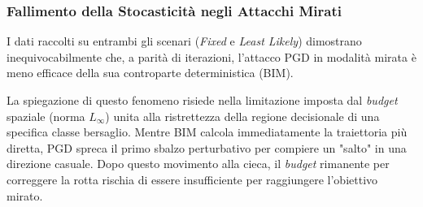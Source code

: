 \documentclass[a4paper, 12pt]{article}
\begin{document}
\subsubsection*{Fallimento della Stocasticità negli Attacchi Mirati}
I dati raccolti su entrambi gli scenari (\textit{Fixed} e \textit{Least Likely}) dimostrano inequivocabilmente che, 
a parità di iterazioni, l'attacco PGD in modalità mirata è meno efficace della sua controparte deterministica (BIM).

La spiegazione di questo fenomeno risiede nella limitazione imposta dal \textit{budget} spaziale
(norma $L_\infty$) unita alla ristrettezza della regione decisionale di una specifica classe bersaglio. 
Mentre BIM calcola immediatamente la traiettoria più diretta, PGD spreca il primo sbalzo perturbativo per compiere
un "salto" in una direzione casuale. Dopo questo movimento alla cieca, il \textit{budget} rimanente per correggere 
la rotta rischia di essere insufficiente per raggiungere l'obiettivo mirato.
\end{document}
